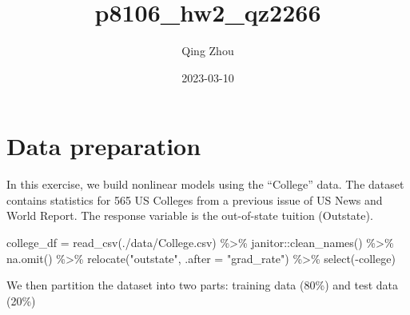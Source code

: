 \documentclass[
]{article}
\title{p8106\_hw2\_qz2266}
\author{Qing Zhou}
\date{2023-03-10}
\newenvironment{Shaded}{\begin{snugshade}}{\end{snugshade}}
\newcommand{\AttributeTok}[1]{\textcolor[rgb]{0.77,0.63,0.00}{#1}}
\newcommand{\CommentTok}[1]{\textcolor[rgb]{0.56,0.35,0.01}{\textit{#1}}}
\newcommand{\ConstantTok}[1]{\textcolor[rgb]{0.00,0.00,0.00}{#1}}
\newcommand{\DecValTok}[1]{\textcolor[rgb]{0.00,0.00,0.81}{#1}}
\newcommand{\FloatTok}[1]{\textcolor[rgb]{0.00,0.00,0.81}{#1}}
\newcommand{\FunctionTok}[1]{\textcolor[rgb]{0.00,0.00,0.00}{#1}}
\newcommand{\NormalTok}[1]{#1}
\newcommand{\OtherTok}[1]{\textcolor[rgb]{0.56,0.35,0.01}{#1}}
\newcommand{\SpecialCharTok}[1]{\textcolor[rgb]{0.00,0.00,0.00}{#1}}
\newcommand{\StringTok}[1]{\textcolor[rgb]{0.31,0.60,0.02}{#1}}
\begin{document}
\maketitle

\hypertarget{data-preparation}{%
\section{Data preparation}\label{data-preparation}}

In this exercise, we build nonlinear models using the ``College'' data.
The dataset contains statistics for 565 US Colleges from a previous
issue of US News and World Report. The response variable is the
out-of-state tuition (Outstate).

\begin{Shaded}
\begin{Highlighting}[]
\NormalTok{college\_df }\OtherTok{=} \FunctionTok{read\_csv}\NormalTok{(}\StringTok{\textquotesingle{}./data/College.csv\textquotesingle{}}\NormalTok{) }\SpecialCharTok{\%\textgreater{}\%} 
\NormalTok{  janitor}\SpecialCharTok{::}\FunctionTok{clean\_names}\NormalTok{() }\SpecialCharTok{\%\textgreater{}\%}
  \FunctionTok{na.omit}\NormalTok{() }\SpecialCharTok{\%\textgreater{}\%}
  \FunctionTok{relocate}\NormalTok{(}\StringTok{"outstate"}\NormalTok{, }\AttributeTok{.after =} \StringTok{"grad\_rate"}\NormalTok{) }\SpecialCharTok{\%\textgreater{}\%}
  \FunctionTok{select}\NormalTok{(}\SpecialCharTok{{-}}\NormalTok{college)}
\end{Highlighting}
\end{Shaded}

We then partition the dataset into two parts: training data (80\%) and
test data (20\%)

\begin{Shaded}
\end{Shaded}
\end{document}
